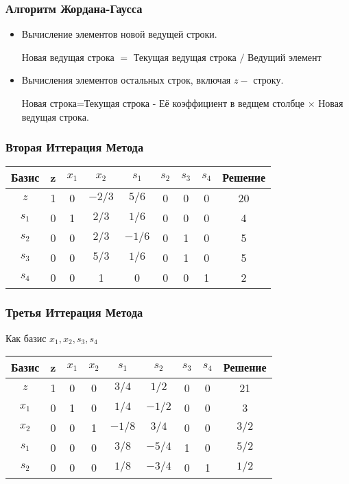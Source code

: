 \documentclass[12pt]{beamer}
\begin{document}
\begin{frame}
	\frametitle{Алгоритм Жордана-Гаусса}
	\begin{itemize}
		\item Вычисление элементов новой ведущей строки.
		
		Новая ведущая строка $=$ Текущая ведущая строка $/$ Ведущий элемент
		\item Вычисления элементов остальных строк, включая $z-$ строку.
		
		Новая строка=Текущая строка - Её коэффициент в ведщем столбце $\times$ Новая ведущая строка.
	\end{itemize}
\end{frame}
\begin{frame}
	\frametitle{Вторая Иттерация Метода}
	\begin{tabular}{|c|c|c|c|c|c|c|c|c|}
		\hline
		Базис & z  & $x_1$ & $x_2$  & $s_1$  & $s_2$  & $s_3$  & $s_4$  & Решение \\
		\hline
		$z $& 1  &  0 & ${-2}/{3}$ & ${5}/{6}$ & 0  & 0  & 0 & 20 \\
		\hline
		$s_1$& 0 & 1 & ${2}/{3}$  & ${1}/{6}$  & 0 & 0 & 0 & 4 \\
		
		$s_2$& 0 & 0 & ${2}/{3}$ & ${-1}/{6}$ & 0 & 1 & 0 & 5 \\
		
		$s_3$& 0 & 0 & ${5}/{3}$ & ${1}/{6}$ & 0 & 1 & 0 & 5 \\
		
		$s_4$& 0 & 0 & 1 & 0 & 0 & 0 & 1 & 2 \\ 
		\hline
	\end{tabular}
\end{frame}
\begin{frame}
	\frametitle{Третья Иттерация Метода}
Как базис $ x_1,x_2,s_3,s_4$



\begin{tabular}{|c|c|c|c|c|c|c|c|c|}
	\hline
	Базис & z  & $x_1$ & $x_2$  & $s_1$  & $s_2$  & $s_3$  & $s_4$  & Решение \\
	\hline
	$z $& 1  &  0 & 0 & $3/4$ & $1/2$  & 0  & 0 & 21 \\
	\hline
	$x_1$& 0 & 1 & 0  & $1/4$  & $-1/2$ & 0 & 0 & 3 \\
	
	$x_2$& 0 & 0 & 1 & $-1/8$ & $3/4$ & 0 & 0 & $3/2$ \\
	
	$s_1$& 0 & 0 & 0 & $3/8$ & $-5/4$ & 1 & 0 & $5/2$ \\
	
	$s_2$& 0 & 0 & 0 & $1/8$ & $-3/4$ & 0 & 1 & $1/2$ \\ 
	\hline
\end{tabular}
\end{frame}
\end{document}
